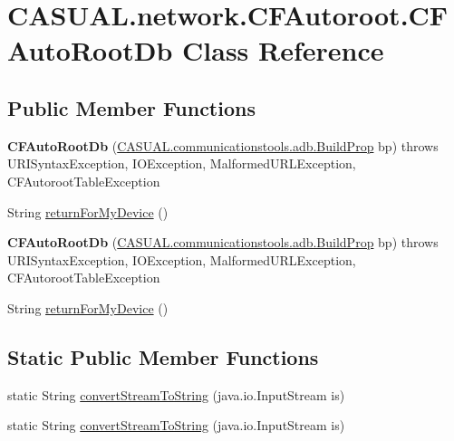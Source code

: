 \hypertarget{class_c_a_s_u_a_l_1_1network_1_1_c_f_autoroot_1_1_c_f_auto_root_db}{\section{C\-A\-S\-U\-A\-L.\-network.\-C\-F\-Autoroot.\-C\-F\-Auto\-Root\-Db Class Reference}
\label{class_c_a_s_u_a_l_1_1network_1_1_c_f_autoroot_1_1_c_f_auto_root_db}
}
\subsection*{Public Member Functions}
\begin{DoxyCompactItemize}
\item 
\hypertarget{class_c_a_s_u_a_l_1_1network_1_1_c_f_autoroot_1_1_c_f_auto_root_db_a00435fbc4a3418ff6f715687b10d6e13}{{\bfseries C\-F\-Auto\-Root\-Db} (\hyperlink{class_c_a_s_u_a_l_1_1communicationstools_1_1adb_1_1_build_prop}{C\-A\-S\-U\-A\-L.\-communicationstools.\-adb.\-Build\-Prop} bp)  throws U\-R\-I\-Syntax\-Exception, I\-O\-Exception, Malformed\-U\-R\-L\-Exception, C\-F\-Autoroot\-Table\-Exception }\label{class_c_a_s_u_a_l_1_1network_1_1_c_f_autoroot_1_1_c_f_auto_root_db_a00435fbc4a3418ff6f715687b10d6e13}

\item 
String \hyperlink{class_c_a_s_u_a_l_1_1network_1_1_c_f_autoroot_1_1_c_f_auto_root_db_a1afcc2be0e9ac7b3bec7946595d8b16e}{return\-For\-My\-Device} ()
\item 
\hypertarget{class_c_a_s_u_a_l_1_1network_1_1_c_f_autoroot_1_1_c_f_auto_root_db_a00435fbc4a3418ff6f715687b10d6e13}{{\bfseries C\-F\-Auto\-Root\-Db} (\hyperlink{class_c_a_s_u_a_l_1_1communicationstools_1_1adb_1_1_build_prop}{C\-A\-S\-U\-A\-L.\-communicationstools.\-adb.\-Build\-Prop} bp)  throws U\-R\-I\-Syntax\-Exception, I\-O\-Exception, Malformed\-U\-R\-L\-Exception, C\-F\-Autoroot\-Table\-Exception }\label{class_c_a_s_u_a_l_1_1network_1_1_c_f_autoroot_1_1_c_f_auto_root_db_a00435fbc4a3418ff6f715687b10d6e13}

\item 
String \hyperlink{class_c_a_s_u_a_l_1_1network_1_1_c_f_autoroot_1_1_c_f_auto_root_db_a1afcc2be0e9ac7b3bec7946595d8b16e}{return\-For\-My\-Device} ()
\end{DoxyCompactItemize}
\subsection*{Static Public Member Functions}
\begin{DoxyCompactItemize}
\item 
static String \hyperlink{class_c_a_s_u_a_l_1_1network_1_1_c_f_autoroot_1_1_c_f_auto_root_db_a00b3ec8baf5a523f0c4dc8964de127ea}{convert\-Stream\-To\-String} (java.\-io.\-Input\-Stream is)
\item 
static String \hyperlink{class_c_a_s_u_a_l_1_1network_1_1_c_f_autoroot_1_1_c_f_auto_root_db_a00b3ec8baf5a523f0c4dc8964de127ea}{convert\-Stream\-To\-String} (java.\-io.\-Input\-Stream is)
\end{DoxyCompactItemize}


